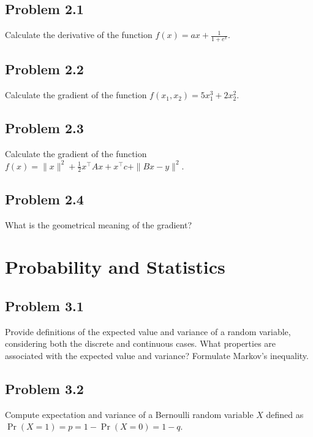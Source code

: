 \documentclass{article}
\begin{document}
	\subsection*{Problem 2.1}
	
	Calculate the derivative of the function $f(x) = a x + \frac{1}{1 + e^x}$.
	
	\subsection*{Problem 2.2}
	
	Calculate the gradient of the function $f(x_1, x_2) = 5 x_1^3 + 2 x_2^2$.
	
	\subsection*{Problem 2.3}
	
	Calculate the gradient of the function $f(x) = \|x\|^2 + \frac{1}{2} x^\top A x + x^\top c + \|Bx - y\|^2$.
	
	\vspace{20 pt}
	
	\subsection*{Problem 2.4}
	
	What is the geometrical meaning of the gradient? 
	
	\vspace{10 pt}
	
	\section{Probability and Statistics}
	\subsection*{Problem 3.1}
	Provide definitions of the expected value and variance of a random variable, considering both the discrete and continuous cases. What properties are associated with the expected value and variance? Formulate Markov's inequality.
	
	\vspace{70 pt}
	
	\subsection*{Problem 3.2}
	Compute expectation and variance of a Bernoulli random variable $X$ defined as
	$\Pr(X=1) = p = 1 - \Pr(X=0) = 1 - q$.
	
\end{document}
